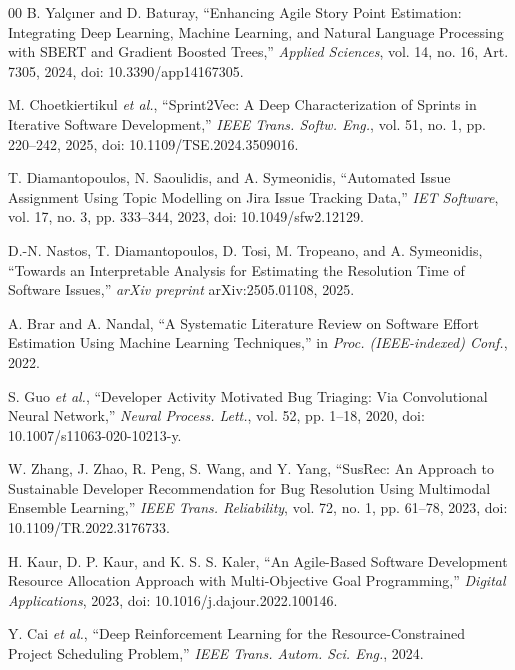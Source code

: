 \documentclass[conference]{IEEEtran}
\begin{document}
\begin{thebibliography}{00}
B. Yal\c{c}{\i}ner and D. Baturay,
``Enhancing Agile Story Point Estimation: Integrating Deep Learning, Machine Learning, and Natural Language Processing with SBERT and Gradient Boosted Trees,''
\textit{Applied Sciences}, vol. 14, no. 16, Art. 7305, 2024,
doi: 10.3390/app14167305.

M. Choetkiertikul \textit{et al.},
``Sprint2Vec: A Deep Characterization of Sprints in Iterative Software Development,''
\textit{IEEE Trans. Softw. Eng.}, vol. 51, no. 1, pp. 220--242, 2025,
doi: 10.1109/TSE.2024.3509016.

T. Diamantopoulos, N. Saoulidis, and A. Symeonidis,
``Automated Issue Assignment Using Topic Modelling on Jira Issue Tracking Data,''
\textit{IET Software}, vol. 17, no. 3, pp. 333--344, 2023,
doi: 10.1049/sfw2.12129.

D.-N. Nastos, T. Diamantopoulos, D. Tosi, M. Tropeano, and A. Symeonidis,
``Towards an Interpretable Analysis for Estimating the Resolution Time of Software Issues,''
\textit{arXiv preprint} arXiv:2505.01108, 2025.

A. Brar and A. Nandal,
``A Systematic Literature Review on Software Effort Estimation Using Machine Learning Techniques,''
in \textit{Proc. (IEEE-indexed) Conf.}, 2022.

S. Guo \textit{et al.}, ``Developer Activity Motivated Bug Triaging: Via Convolutional Neural Network,''
\textit{Neural Process. Lett.}, vol. 52, pp. 1--18, 2020,
doi: 10.1007/s11063-020-10213-y.

W. Zhang, J. Zhao, R. Peng, S. Wang, and Y. Yang,
``SusRec: An Approach to Sustainable Developer Recommendation for Bug Resolution Using Multimodal Ensemble Learning,''
\textit{IEEE Trans. Reliability}, vol. 72, no. 1, pp. 61--78, 2023,
doi: 10.1109/TR.2022.3176733.

H. Kaur, D. P. Kaur, and K. S. S. Kaler,
``An Agile-Based Software Development Resource Allocation Approach with Multi-Objective Goal Programming,''
\textit{Digital Applications}, 2023,
doi: 10.1016/j.dajour.2022.100146.

Y. Cai \textit{et al.}, ``Deep Reinforcement Learning for the Resource-Constrained Project Scheduling Problem,''
\textit{IEEE Trans. Autom. Sci. Eng.}, 2024.


\end{thebibliography}
\end{document}
